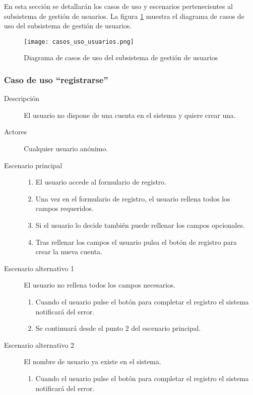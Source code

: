 En esta sección se detallarán los casos de uso y escenarios pertenecientes al subsistema de gestión de usuarios.
La figura \ref{fig:casos_uso_subsistema_usuarios} muestra el diagrama de casos de uso del subsistema de gestión de usuarios.

\begin{figure}[h]
\centering
\texttt{[image: casos\_uso\_usuarios.png]}
\caption{Diagrama de casos de uso del subsistema de gestión de usuarios}
\label{fig:casos_uso_subsistema_usuarios}
\end{figure}


\subsubsection{Caso de uso ``registrarse''}
\begin{description}
\item[Descripción] 				El usuario no dispone de una cuenta en el sistema y quiere crear una.
\item[Actores]					Cualquier usuario anónimo.
\item[Escenario principal]	 	\hfill
								\begin{enumerate}
								\item El usuario accede al formulario de registro.
								\item Una vez en el formulario de registro, el usuario rellena todos los campos requeridos.
								\item Si el usuario lo decide también puede rellenar los campos opcionales.
								\item Tras rellenar los campos el usuario pulsa el botón de registro para crear la nueva cuenta.
								\end{enumerate}
\item[Escenario alternativo 1]	El usuario no rellena todos los campos necesarios.
								\begin{enumerate}
								\item Cuando el usuario pulse el botón para completar el registro el sistema notificará del error.
								\item Se continuará desde el punto 2 del escenario principal.
								\end{enumerate}
\item[Escenario alternativo 2]	El nombre de usuario ya existe en el sistema.
								\begin{enumerate}
								\item Cuando el usuario pulse el botón para completar el registro el sistema notificará del error.

\end{enumerate}
\end{description}
